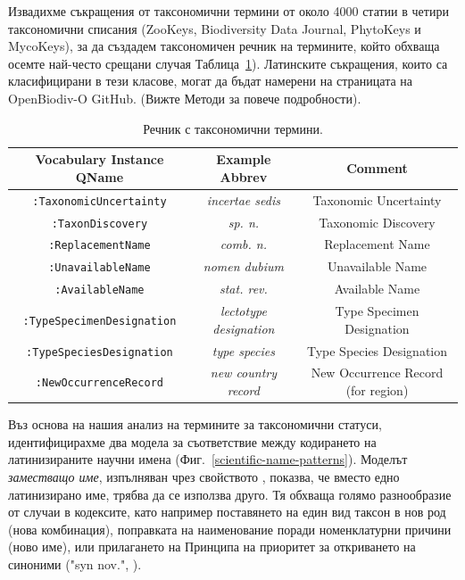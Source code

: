 Извадихме съкращения от таксономични термини от около 4000 статии в четири таксономични списания (ZooKeys, Biodiversity Data Journal, PhytoKeys и MycoKeys), за да създадем таксономичен речник на термините, който обхваща осемте най-често срещани случая Таблица~\ref{taxonomic-status-vocabulary}). Латинските съкращения, които са класифицирани в тези класове, могат да бъдат намерени на страницата на OpenBiodiv-O GitHub. (Вижте Методи за повече подробности).

\begin{table}[h!]
\caption{Речник с таксономични термини.}
\begin{tabular}{ccc}
\hline
Vocabulary Instance QName & Example Abbrev & Comment\\ \hline
{\tt :TaxonomicUncertainty} & \emph{incertae sedis} & Taxonomic Uncertainty\\
{\tt :TaxonDiscovery} & \emph{sp. n.} & Taxonomic Discovery \\
{\tt :ReplacementName} & \emph{comb. n.} & Replacement Name \\
{\tt :UnavailableName} & \emph{nomen dubium} &  Unavailable Name \\
{\tt :AvailableName} & \emph{stat. rev.} & Available Name \\
{\tt :TypeSpecimenDesignation} & \emph{lectotype designation} & Type Specimen Designation \\
{\tt :TypeSpeciesDesignation} & \emph{type species} & Type Species Designation\\
{\tt :NewOccurrenceRecord} & \emph{new country record} & New Occurrence Record (for region)\\
\hline
\end{tabular}
\label{taxonomic-status-vocabulary}
\end{table}

Въз основа на нашия анализ на термините за таксономични статуси, идентифицирахме два модела за съответствие между кодирането на латинизираните научни имена (Фиг.~\ref{scientific-name-patterns}). Моделът \emph{заместващо име}, изпълняван чрез свойството , показва, че вместо едно латинизирано име,  трябва да се използва друго. Тя обхваща голямо разнообразие от случаи в кодексите, като например поставянето на един вид таксон в нов род (нова комбинация), поправката на наименование поради номенклатурни причини (ново име), или прилагането на Принципа на приоритет за откриването на синоними ("syn nov.", \cite{international_commission_on_zoological_nomenclature_official_2017}).

